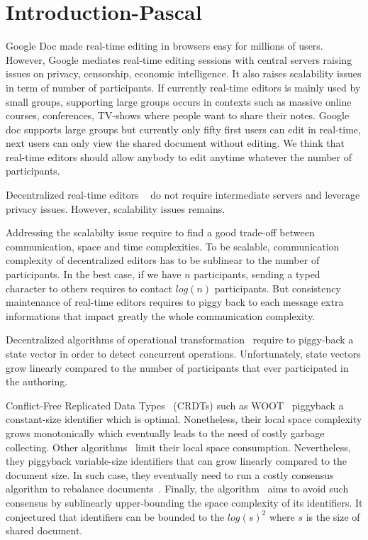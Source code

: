 
\section{Introduction-Pascal}



Google Doc made real-time editing in browsers easy for millions of
users. However, Google mediates real-time editing sessions with
central servers raising issues on privacy, censorship, economic
intelligence. It also raises scalability issues in term of number of
participants. If currently real-time editors is mainly used by small
groups, supporting large groups occurs in contexts such as massive
online courses, conferences, TV-shows where people want to share their
notes. Google doc supports large groups but currently only fifty first
users can edit in real-time, next users can only view the shared
document without editing. We think that real-time editors should allow
anybody to edit anytime whatever the number of participants.

Decentralized real-time editors ~\cite{oster2006data,
  sun1998operational, sun2009contextbased} do not require intermediate
servers and leverage privacy issues. However, scalability issues
remains.

Addressing the scalabilty issue require to find a good trade-off
between communication, space and time complexities. To be
scalable, communication complexity of decentralized editors has to be
sublinear to the number of participants. In the best case, if we have
$n$ participants, sending a typed character to others requires to
contact $log(n)$ participants. But consistency maintenance of
real-time editors requires to piggy back to each message extra
informations that impact greatly the whole communication complexity.

Decentralized algorithms of operational
transformation~\cite{sun2009contextbased} require to piggy-back a
state vector in order to detect concurrent operations. Unfortunately,
state vectors grow linearly compared to the number of participants that
ever participated in the authoring.

Conflict-Free Replicated Data Types~\cite{shapiro2011comprehensive}
(CRDTs) such as WOOT~\cite{oster2006data} piggyback a constant-size
identifier which is optimal. Nonetheless, their local space complexity
grows monotonically which eventually leads to the need of costly
garbage collecting. Other algorithms~\cite{preguica2009commutative,
  weiss2010logootundo} limit their local space
consumption. Nevertheless, they piggyback variable-size identifiers
that can grow linearly compared to the document size. In such case,
they eventually need to run a costly consensus algorithm to rebalance
documents~\cite{zawirski2011asynchronous}. Finally, the \LSEQ
algorithm~\cite{nedelec2013concurrency} aims to avoid such consensus
by sublinearly upper-bounding the space complexity of its
identifiers. It conjectured that identifiers can be bounded to
  the $log(s)^2$ where $s$ is the size of shared document.

